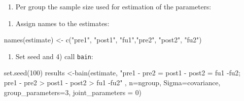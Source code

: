 \documentclass[
]{book}
\newenvironment{Shaded}{\begin{snugshade}}{\end{snugshade}}
\newcommand{\AttributeTok}[1]{\textcolor[rgb]{0.77,0.63,0.00}{#1}}
\newcommand{\DecValTok}[1]{\textcolor[rgb]{0.00,0.00,0.81}{#1}}
\newcommand{\FunctionTok}[1]{\textcolor[rgb]{0.00,0.00,0.00}{#1}}
\newcommand{\NormalTok}[1]{#1}
\newcommand{\OtherTok}[1]{\textcolor[rgb]{0.56,0.35,0.01}{#1}}
\newcommand{\SpecialCharTok}[1]{\textcolor[rgb]{0.00,0.00,0.00}{#1}}
\newcommand{\StringTok}[1]{\textcolor[rgb]{0.31,0.60,0.02}{#1}}
\providecommand{\tightlist}{%
  \setlength{\itemsep}{0pt}\setlength{\parskip}{0pt}}
\begin{document}
\begin{enumerate}
\def\labelenumi{\alph{enumi})}
\setcounter{enumi}{2}
\tightlist
\item
  Per group the sample size used for estimation of the parameters:
\end{enumerate}

\begin{Shaded}
\end{Shaded}

\begin{enumerate}
\def\labelenumi{\arabic{enumi})}
\setcounter{enumi}{1}
\tightlist
\item
  Assign names to the estimates:
\end{enumerate}

\begin{Shaded}
\begin{Highlighting}[]
\FunctionTok{names}\NormalTok{(estimate) }\OtherTok{\textless{}{-}} \FunctionTok{c}\NormalTok{(}\StringTok{"pre1"}\NormalTok{, }\StringTok{"post1"}\NormalTok{, }\StringTok{"fu1"}\NormalTok{,}\StringTok{"pre2"}\NormalTok{, }\StringTok{"post2"}\NormalTok{, }\StringTok{"fu2"}\NormalTok{)}
\end{Highlighting}
\end{Shaded}

\begin{enumerate}
\def\labelenumi{\arabic{enumi})}
\setcounter{enumi}{2}
\tightlist
\item
  Set seed and 4) call \texttt{bain}:
\end{enumerate}

\begin{Shaded}
\begin{Highlighting}[]
\FunctionTok{set.seed}\NormalTok{(}\DecValTok{100}\NormalTok{)}
\NormalTok{results }\OtherTok{\textless{}{-}}\FunctionTok{bain}\NormalTok{(estimate, }\StringTok{"pre1 {-} pre2 = post1 {-} post2 = fu1 {-}fu2;}
\StringTok{pre1 {-} pre2 \textgreater{} post1 {-} post2 \textgreater{} fu1 {-}fu2"}\NormalTok{  , }\AttributeTok{n=}\NormalTok{ngroup, }\AttributeTok{Sigma=}\NormalTok{covariance,}
\AttributeTok{group\_parameters=}\DecValTok{3}\NormalTok{, }\AttributeTok{joint\_parameters =} \DecValTok{0}\NormalTok{)}
\end{Highlighting}
\end{Shaded}
\end{document}
